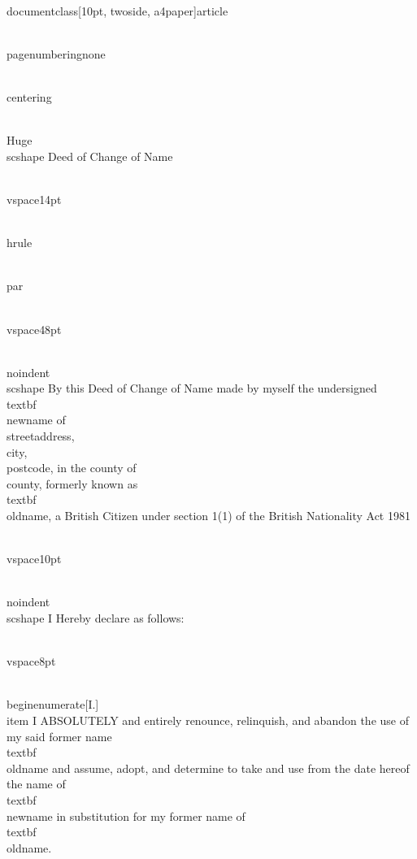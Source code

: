 \\documentclass[10pt, twoside, a4paper]{article}
\begin{document}
\\pagenumbering{none} %

{
	\\centering

	\\Huge
	\\scshape
	Deed of Change of Name

	\\vspace{14pt}

	\\hrule

	\\par
}

\\vspace{48pt}

\\noindent{\\scshape By this Deed of Change of Name} made by myself the undersigned \\textbf{\\newname} of \\streetaddress, \\city, \\postcode, in the county of \\county, formerly known as \\textbf{\\oldname}, a British Citizen under section 1(1) of the British Nationality Act 1981

\\vspace{10pt}

\\noindent{\\scshape I Hereby declare as follows:}

\\vspace{8pt}

\\begin{enumerate}[I.]
    \\item I ABSOLUTELY and entirely renounce, relinquish, and abandon the use of my said former name \\textbf{\\oldname} and assume, adopt, and determine to take and use from the date hereof the name of \\textbf{\\newname} in substitution for my former name of \\textbf{\\oldname}.
	
\end{document}

